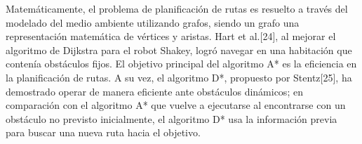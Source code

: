 \documentclass[sigconf]{acmart}
\begin{document}
Matemáticamente, el problema de planificación de rutas es resuelto a través del modelado del medio ambiente utilizando grafos, siendo un grafo una representación matemática de vértices y aristas. Hart et al.[24], al mejorar el algoritmo de Dijkstra para el robot Shakey, logró navegar en una habitación que contenía obstáculos fijos. El objetivo principal del algoritmo A* es la eficiencia en la planificación de rutas. A su vez, el algoritmo D*, propuesto por Stentz[25], ha demostrado operar de manera eficiente ante obstáculos dinámicos; en comparación con el algoritmo A* que vuelve a ejecutarse al encontrarse con un obstáculo no previsto inicialmente, el algoritmo D* usa la información previa para buscar una nueva ruta hacia el objetivo.




\end{document}
